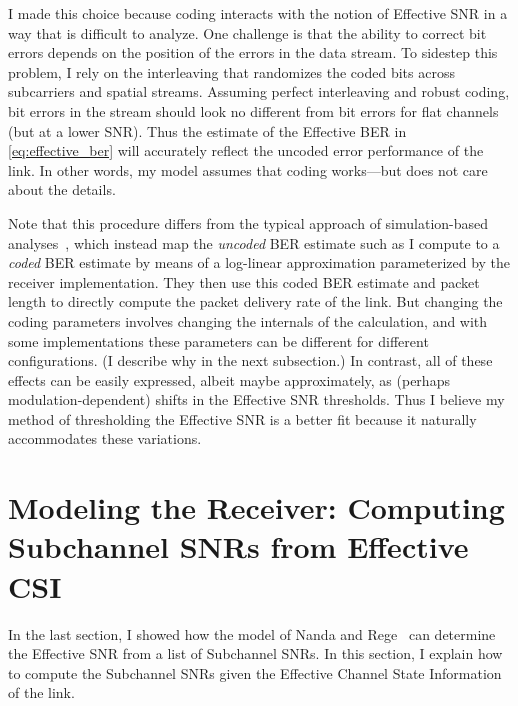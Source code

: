 I made this choice because coding interacts with the notion of Effective SNR in a way that is difficult to analyze. One challenge is that the ability to correct bit errors depends on the position of the errors in the data stream. To sidestep this problem, I rely on the interleaving that randomizes the coded bits across subcarriers and spatial streams. Assuming perfect interleaving and robust coding, bit errors in the stream should look no different from bit errors for flat channels (but at a lower SNR). Thus the estimate of the Effective BER in \eqref{eq:effective_ber} will accurately reflect the uncoded error performance of the link. In other words, my model assumes that coding works---but does not care about the details.

Note that this procedure differs from the typical approach of simulation-based analyses~\cite{Kant_FLA, Liu_EESM, Nortel_3g}, which instead map the \emph{uncoded} BER estimate such as I compute to a \emph{coded} BER estimate by means of a log-linear approximation parameterized by the receiver implementation. They then use this coded BER estimate and packet length to directly compute the packet delivery rate of the link. But changing the coding parameters involves changing the internals of the calculation, and with some implementations these parameters can be different for different configurations. (I describe why in the next subsection.) In contrast, all of these effects can be easily expressed, albeit maybe approximately, as (perhaps modulation-dependent) shifts in the Effective SNR thresholds. Thus I believe my method of thresholding the Effective SNR is a better fit because it naturally accommodates these variations.


\section{Modeling the Receiver: Computing Subchannel SNRs from Effective CSI}
\label{sec:model_receiver}
In the last section, I showed how the model of Nanda and Rege~\cite{Nanda_EffectiveSNR} can determine the Effective SNR from a list of Subchannel SNRs. In this section, I explain how to compute the Subchannel SNRs given the Effective Channel State Information of the link.

